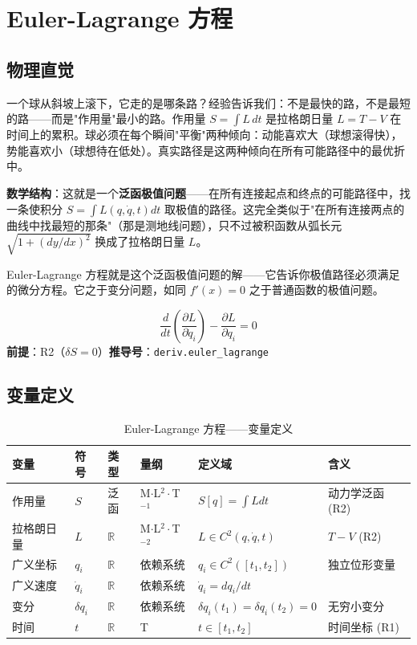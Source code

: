 \section{Euler-Lagrange 方程}

\subsection{物理直觉}

一个球从斜坡上滚下，它走的是哪条路？经验告诉我们：不是最快的路，不是最短的路——而是"作用量"最小的路。作用量 $S = \int L\,dt$ 是拉格朗日量 $L = T - V$ 在时间上的累积。球必须在每个瞬间"平衡"两种倾向：动能喜欢大（球想滚得快），势能喜欢小（球想待在低处）。真实路径是这两种倾向在所有可能路径中的最优折中。

\textbf{数学结构}：这就是一个\textbf{泛函极值问题}——在所有连接起点和终点的可能路径中，找一条使积分 $S = \int L(q,\dot{q},t)dt$ 取极值的路径。这完全类似于"在所有连接两点的曲线中找最短的那条"（那是测地线问题），只不过被积函数从弧长元 $\sqrt{1+(dy/dx)^2}$ 换成了拉格朗日量 $L$。

Euler-Lagrange 方程就是这个泛函极值问题的解——它告诉你极值路径必须满足的微分方程。它之于变分问题，如同 $f'(x)=0$ 之于普通函数的极值问题。

\begin{lawbox}
  \[
  \frac{d}{dt}\!\left( \frac{\partial L}{\partial \dot{q}_i} \right) - \frac{\partial L}{\partial q_i} = 0
  \]
  \textbf{前提}：R2（$\delta S = 0$）\quad \textbf{推导号}：\texttt{deriv.euler\_lagrange}
\end{lawbox}

\subsection{变量定义}

\begin{table}[h]
\centering\small
\begin{tabular}{p{1.8cm}p{1.5cm}p{2cm}p{1.5cm}p{3cm}p{3.5cm}}
\toprule
\textbf{变量} & \textbf{符号} & \textbf{类型} & \textbf{量纲} & \textbf{定义域} & \textbf{含义} \\
\midrule
作用量 & $S$ & 泛函 & M$\cdot$L$^2\cdot$T$^{-1}$ & $S[q] = \int L dt$ & 动力学泛函 (R2) \\
拉格朗日量 & $L$ & $\mathbb{R}$ & M$\cdot$L$^2\cdot$T$^{-2}$ & $L \in C^2(q,\dot{q},t)$ & $T-V$ (R2) \\
广义坐标 & $q_i$ & $\mathbb{R}$ & 依赖系统 & $q_i \in C^2([t_1,t_2])$ & 独立位形变量 \\
广义速度 & $\dot{q}_i$ & $\mathbb{R}$ & 依赖系统 & $\dot{q}_i = dq_i/dt$ & \\
变分 & $\delta q_i$ & $\mathbb{R}$ & 依赖系统 & $\delta q_i(t_1)=\delta q_i(t_2)=0$ & 无穷小变分 \\
时间 & $t$ & $\mathbb{R}$ & T & $t \in [t_1,t_2]$ & 时间坐标 (R1) \\
\bottomrule
\end{tabular}
\caption{Euler-Lagrange 方程——变量定义}
\end{table}

